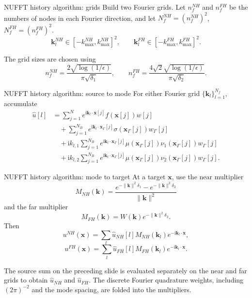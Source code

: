 \documentclass[aspectratio=169,11pt]{beamer}
\newcommand{\ii}{\mathrm i}
\newcommand{\x}{\bm{x}}
\newcommand{\kvec}{\bm{k}}
\begin{document}
\begin{frame}{NUFFT history algorithm: grids}
\small
Build two Fourier grids.  Let $n_f^{NH}$ and $n_f^{FH}$ be the numbers of
nodes in each Fourier direction, and let
$N_f^{NH}=(n_f^{NH})^2$, $N_f^{FH}=(n_f^{FH})^2$.
\[
  \kvec_l^{NH}\in[-k_{\max}^{NH},k_{\max}^{NH}]^2,
  \qquad
  \kvec_l^{FH}\in[-k_{\max}^{FH},k_{\max}^{FH}]^2.
\]

The grid sizes are chosen using
\[
  n_f^{NH}
  =
  \frac{2\sqrt{\log(1/\epsilon)}}{\pi\sqrt{\delta_1}},
  \qquad
  n_f^{FH}
  =
  \frac{4\sqrt2\sqrt{\log(1/\epsilon)}}{\pi\sqrt{\delta_2}}.
\]
\end{frame}

\begin{frame}{NUFFT history algorithm: source to mode}
\small
For either Fourier grid $\{\kvec_l\}_{l=1}^{N_f}$, accumulate
\[
\begin{aligned}
\hat u[l]
&=
\sum_{j=1}^{N} e^{\ii\kvec_l\cdot \x[j]} f(\x[j])w[j]\\
&\quad+
\sum_{j=1}^{N_B} e^{\ii\kvec_l\cdot \x_\Gamma[j]}
\sigma(\x_\Gamma[j])w_\Gamma[j]\\
&\quad+
\ii k_{l,1}\sum_{j=1}^{N_B} e^{\ii\kvec_l\cdot \x_\Gamma[j]}
\mu(\x_\Gamma[j])\nu_1(\x_\Gamma[j])w_\Gamma[j]\\
&\quad+
\ii k_{l,2}\sum_{j=1}^{N_B} e^{\ii\kvec_l\cdot \x_\Gamma[j]}
\mu(\x_\Gamma[j])\nu_2(\x_\Gamma[j])w_\Gamma[j].
\end{aligned}
\]
\end{frame}

\begin{frame}{NUFFT history algorithm: mode to target}
\small
At a target $\x$, use the near multiplier
\[
  M_{NH}(\kvec)=
  \frac{e^{-\|\kvec\|^2\delta_1}-e^{-\|\kvec\|^2\delta_2}}
       {\|\kvec\|^2}
\]
and the far multiplier
\[
  M_{FH}(\kvec)=W(\kvec)e^{-\|\kvec\|^2\delta_2}.
\]
Then
\[
  u^{NH}(\x)=\sum_l \hat u_{NH}[l]M_{NH}(\kvec_l)e^{-\ii\kvec_l\cdot\x},
\]
\[
  u^{FH}(\x)=\sum_l \hat u_{FH}[l]M_{FH}(\kvec_l)e^{-\ii\kvec_l\cdot\x}.
\]

\vspace{1mm}
The source sum on the preceding slide is evaluated separately on the near and
far grids to obtain $\hat u_{NH}$ and $\hat u_{FH}$.  The discrete Fourier
quadrature weights, including $(2\pi)^{-2}$ and the mode spacing, are folded
into the multipliers.
\end{frame}
\end{document}
